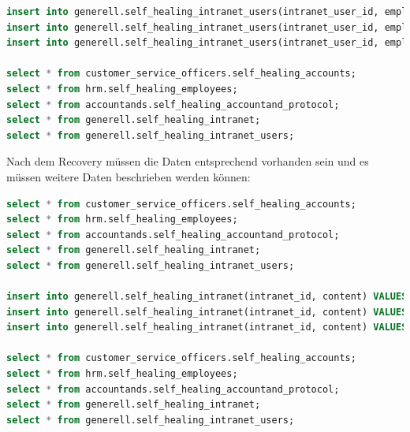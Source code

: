 \begin{lstlisting}[language=sql, caption=Patroni - Self Healing Tests - Failover Data,captionpos=b,label={lst:patroni-self-healing-failover-data},breaklines=true]
insert into generell.self_healing_intranet_users(intranet_user_id, employees_id) values(400, 400);
insert into generell.self_healing_intranet_users(intranet_user_id, employees_id) values(500, 500);
insert into generell.self_healing_intranet_users(intranet_user_id, employees_id) values(600, 600);

select * from customer_service_officers.self_healing_accounts;
select * from hrm.self_healing_employees;
select * from accountands.self_healing_accountand_protocol;
select * from generell.self_healing_intranet;
select * from generell.self_healing_intranet_users;
\end{lstlisting}

Nach dem Recovery müssen die Daten entsprechend vorhanden sein und es müssen weitere Daten beschrieben werden können:
\lstset{style=gra_codestyle}
\begin{lstlisting}[language=sql, caption=Patroni - Self Healing Tests - Recovery Data,captionpos=b,label={lst:patroni-self-healing-recovery-data},breaklines=true]
select * from customer_service_officers.self_healing_accounts;
select * from hrm.self_healing_employees;
select * from accountands.self_healing_accountand_protocol;
select * from generell.self_healing_intranet;
select * from generell.self_healing_intranet_users;

insert into generell.self_healing_intranet(intranet_id, content) VALUES (700, 'yadada');
insert into generell.self_healing_intranet(intranet_id, content) VALUES (800, 'bla bla');
insert into generell.self_healing_intranet(intranet_id, content) VALUES (1100, 'talking and talking');

select * from customer_service_officers.self_healing_accounts;
select * from hrm.self_healing_employees;
select * from accountands.self_healing_accountand_protocol;
select * from generell.self_healing_intranet;
select * from generell.self_healing_intranet_users;
\end{lstlisting}
